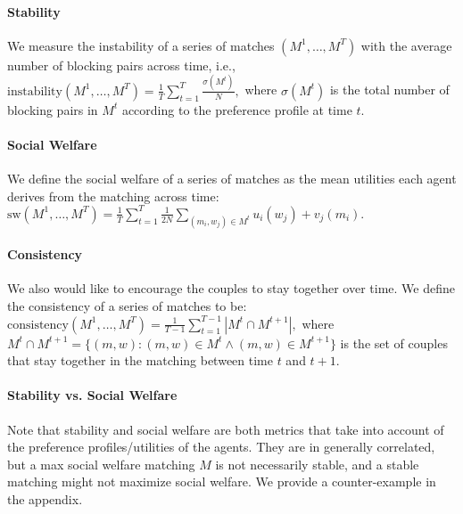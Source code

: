 \paragraph{Stability} We measure the instability of a series of matches $(M^1, \ldots, M^T)$ with the average number of blocking pairs across time, i.e.,
$
    \mbox{instability}(M^1, \ldots, M^T) = \frac{1}{T}\sum_{t=1}^T{\frac{\sigma(M^t)}{N}},
$
where $\sigma(M^t)$ is the total number of blocking pairs in $M^t$ according to the preference profile at time $t$.
\paragraph{Social Welfare} We define the social welfare of a series of matches as the mean utilities each agent derives from the matching across time:
$
    \mbox{sw}(M^1, \ldots, M^T) = \frac{1}{T}\sum_{t=1}^T{\frac{1}{2N}{\sum_{(m_i, w_j)\in M^t}{u_i(w_j) + v_j(m_i)}}}.
$
\paragraph{Consistency} We also would like to encourage the couples to stay together over time. We define the consistency of a series of matches to be:
$
    \mbox{consistency}(M^1, \ldots, M^T) = \frac{1}{T-1}\sum_{t=1}^{T-1}{|M^t \cap M^{t+1}|},
$
where $M^t \cap M^{t+1} = \{(m, w): (m, w) \in M^t \wedge (m, w) \in M^{t+1}\}$ is the set of couples that stay together in the matching between time $t$ and $t+1$.

\paragraph{Stability vs. Social Welfare} Note that stability and social welfare are both metrics that take into account of the preference profiles/utilities of the agents. They are in generally correlated, but a max social welfare matching $M$ is not necessarily stable, and a stable matching might not maximize social welfare. We provide a counter-example in the appendix.



